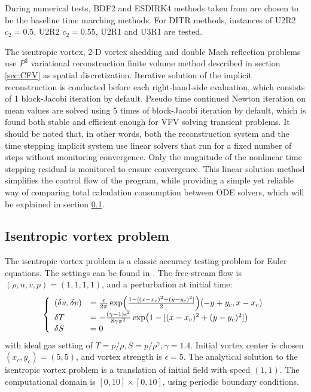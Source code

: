 During numerical tests,
BDF2 and ESDIRK4 methods taken from
\cite{bijl2002implicitBDFvESDIRK,kennedy2003additiveARK}
are chosen to be
the baseline time marching methods.
For DITR methods, instances of
U2R2 $c_2 = 0.5$, U2R2 $c_2 = 0.55$, U2R1 and U3R1 are tested.

The isentropic vortex, 2-D vortex shedding
and  double Mach reflection problems use
$P^3$ variational reconstruction finite volume method described in
section \ref{sec:CFV} as spatial  discretization.
Iterative solution of the implicit reconstruction
is conducted before each right-hand-side evaluation,
which consists of 1 block-Jacobi iteration by default.
Pseudo time continued Newton iteration on mean values are
solved using 5 times of block-Jacobi iteration by default,
which is found both stable and efficient enough for VFV solving
transient problems.
It should be noted that, in other words,
both the reconstruction system and
the time stepping implicit system use linear solvers that
run for a fixed number of steps without monitoring convergence.
Only the magnitude of the nonlinear time stepping residual
is monitored to ensure convergence.
This linear solution method simplifies the control flow of
the program,
while providing a simple yet reliable way of
comparing total calculation consumption between ODE solvers,
which will be explained in section \ref{ssec:resultIV}.



\subsection{Isentropic vortex problem}
\label{ssec:resultIV}

The isentropic vortex problem is a classic
accuracy testing problem for Euler equations.
The settings can be found in \cite{hu1999weighted_WENO}.
The free-stream flow is $(\rho,u,v,p)=(1,1,1,1)$,
and a perturbation at initial time:
\begin{equation}
    \left\{
    \begin{array}[2]{ll}
        (\delta u, \delta v) & = \frac{\epsilon}{2\pi}\exp(\frac{1-[(x-x_c)^2+(y-y_c)^2]}{2})(-y+y_c,x-x_c) \\
        \delta T             & = - \frac{(\gamma-1)\epsilon^2}{8\gamma\pi^2}\exp(1-[(x-x_c)^2+(y-y_c)^2])   \\
        \delta S             & = 0                                                                          \\
    \end{array}
    \right.
\end{equation}
with ideal gas setting of $T = p/\rho, S= p/\rho^\gamma, \gamma =1.4$.
Initial vortex center is chosen $(x_c,y_c)=(5,5)$,
and vortex strength is $\epsilon = 5$.
The analytical solution to the isentropic vortex problem is a
translation of initial field with speed $(1,1)$.
The computational domain is $[0,10]\times[0,10]$,
using periodic boundary conditions.

